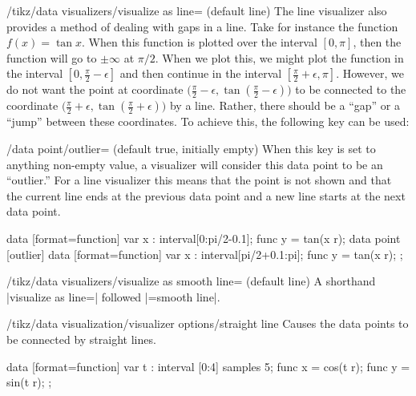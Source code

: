 \begin{key}{/tikz/data visualizers/visualize as line= (default line)}
  The line visualizer also provides a method of dealing with gaps in a
  line. Take for instance the function $f(x) = \tan x$. When this
  function is plotted over the interval $[0,\pi]$, then the function
  will go to $\pm \infty$ at $\pi/2$. When we plot this, we might plot
  the function in the interval $[0,\frac{\pi}{2}-\epsilon]$ and then
  continue in the interval $[\frac{\pi}{2}+\epsilon,\pi]$. However, we
  do not want the point at coordinate $\bigl(\frac{\pi}{2}- \epsilon,
  \tan(\frac{\pi}{2}- \epsilon)\bigr)$ to be connected to the
  coordinate $\bigl(\frac{\pi}{2}+ \epsilon, \tan(\frac{\pi}{2}+
  \epsilon)\bigr)$ by a line. Rather, there should be a ``gap'' or a
  ``jump'' between these coordinates. To achieve this, the following
  key can be used:
  \begin{key}{/data point/outlier= (default true, initially \normalfont empty)}
    When this key is set to anything non-empty value, a visualizer
    will consider this data point to be an ``outlier.'' For a line
    visualizer this means that the point is not shown and that the
    current line ends at the previous data point and a new line starts
    at the next data point.
\begin{codeexample}[width=7cm]
\tikz \datavisualization
 [scientific clean axes, x axis={grid={major at=(pi/2)}},
  visualize as smooth line]
data [format=function] {
  var x : interval[0:pi/2-0.1];
  func y = tan(\value x r);
}
data point [outlier]
data [format=function] {
  var x : interval[pi/2+0.1:pi];
  func y = tan(\value x r);
};
\end{codeexample}
  \end{key}
\end{key}


\begin{key}{/tikz/data visualizers/visualize as smooth line= (default line)}
  A shorthand |visualize as line=|
  followed |=smooth line|.
\end{key}


\begin{key}{/tikz/data visualization/visualizer options/straight line}
  Causes the data points to be connected by straight lines.
\begin{codeexample}[]
\tikz [scale=.55] \datavisualization
 [scientific clean axes, all axes={ticks=few},
  visualize as smooth line=my data,  my data={straight line}]
data [format=function] {
  var t : interval [0:4] samples 5;
  func x = cos(\value t r);
  func y = sin(\value t r);
};
\end{codeexample}
\end{key}


